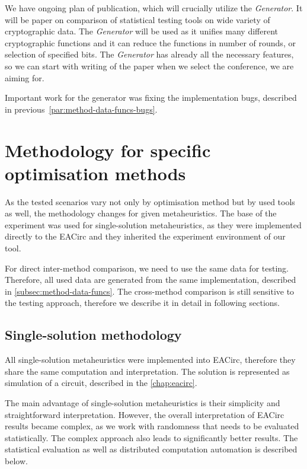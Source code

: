 \documentclass[
  print, %
  Table,   %
  nolof,     %
  nolot,     %
  11pt, %
  oneside  %
]{fithesis3}
\begin{document}
We have ongoing plan of publication, which will crucially utilize the \textit{Generator}. It will be paper on comparison of statistical testing tools on wide variety of cryptographic data. The \textit{Generator} will be used as it unifies many different cryptographic functions and it can reduce the functions in number of rounds, or selection of specified bits. The \textit{Generator} has already all the necessary features, so we can start with writing of the paper when we select the conference, we are aiming for.

Important work for the generator was fixing the implementation bugs, described in previous~\cref{par:method-data-funcs-bugs}.


\section{Methodology for specific optimisation methods}
\label{sec:method-spec}

As the tested scenarios vary not only by optimisation method but by used tools as well, the methodology changes for given metaheuristics. The base of the experiment was used for single-solution metaheuristics, as they were implemented directly to the EACirc and they inherited the experiment environment of our tool.

For direct inter-method comparison, we need to use the same data for testing. Therefore, all used data are generated from the same implementation, described in \cref{subsec:method-data-funcs}. The cross-method comparison is still sensitive to the testing approach, therefore we describe it in detail in following sections.


\subsection{Single-solution methodology}
\label{subsec:method-spec-ss}

All single-solution metaheuristics were implemented into EACirc, therefore they share the same computation and interpretation. The solution is represented as simulation of a circuit, described in the \cref{chap:eacirc}.

The main advantage of single-solution metaheuristics is their simplicity and straightforward interpretation. However, the overall interpretation of EACirc results became complex, as we work with randomness that needs to be evaluated statistically. The complex approach also leads to significantly better results. The statistical evaluation as well as distributed computation automation is described below.
\end{document}
